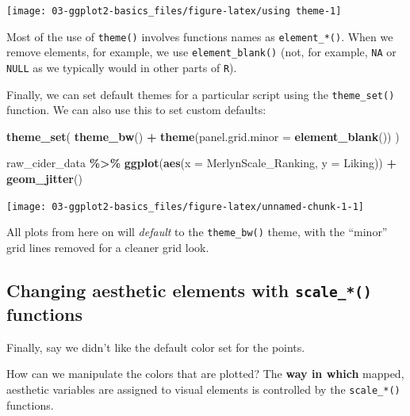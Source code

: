 \documentclass[
]{book}
\newenvironment{Shaded}{\begin{snugshade}}{\end{snugshade}}
\newcommand{\AttributeTok}[1]{\textcolor[rgb]{0.13,0.29,0.53}{#1}}
\newcommand{\FunctionTok}[1]{\textcolor[rgb]{0.13,0.29,0.53}{\textbf{#1}}}
\newcommand{\NormalTok}[1]{#1}
\newcommand{\SpecialCharTok}[1]{\textcolor[rgb]{0.81,0.36,0.00}{\textbf{#1}}}
\begin{document}
\begin{center}\texttt{[image: 03-ggplot2-basics\_files/figure-latex/using theme-1]} \end{center}

Most of the use of \texttt{theme()} involves functions names as \texttt{element\_*()}. When we remove elements, for example, we use \texttt{element\_blank()} (not, for example, \texttt{NA} or \texttt{NULL} as we typically would in other parts of \texttt{R}).

Finally, we can set default themes for a particular script using the \texttt{theme\_set()} function. We can also use this to set custom defaults:

\begin{Shaded}
\begin{Highlighting}[]
\FunctionTok{theme\_set}\NormalTok{(}
  \FunctionTok{theme\_bw}\NormalTok{() }\SpecialCharTok{+} 
    \FunctionTok{theme}\NormalTok{(}\AttributeTok{panel.grid.minor =} \FunctionTok{element\_blank}\NormalTok{())}
\NormalTok{)}

\NormalTok{raw\_cider\_data }\SpecialCharTok{\%\textgreater{}\%}
  \FunctionTok{ggplot}\NormalTok{(}\FunctionTok{aes}\NormalTok{(}\AttributeTok{x =}\NormalTok{ MerlynScale\_Ranking, }\AttributeTok{y =}\NormalTok{ Liking)) }\SpecialCharTok{+} 
  \FunctionTok{geom\_jitter}\NormalTok{()}
\end{Highlighting}
\end{Shaded}

\begin{center}\texttt{[image: 03-ggplot2-basics\_files/figure-latex/unnamed-chunk-1-1]} \end{center}

All plots from here on will \emph{default} to the \texttt{theme\_bw()} theme, with the ``minor'' grid lines removed for a cleaner grid look.

\hypertarget{changing-aesthetic-elements-with-scale_-functions}{%
\subsection{\texorpdfstring{Changing aesthetic elements with \texttt{scale\_*()} functions}{Changing aesthetic elements with scale\_*() functions}}\label{changing-aesthetic-elements-with-scale_-functions}}

Finally, say we didn't like the default color set for the points.

How can we manipulate the colors that are plotted? The \textbf{way in which} mapped, aesthetic variables are assigned to visual elements is controlled by the \texttt{scale\_*()} functions.
\end{document}
